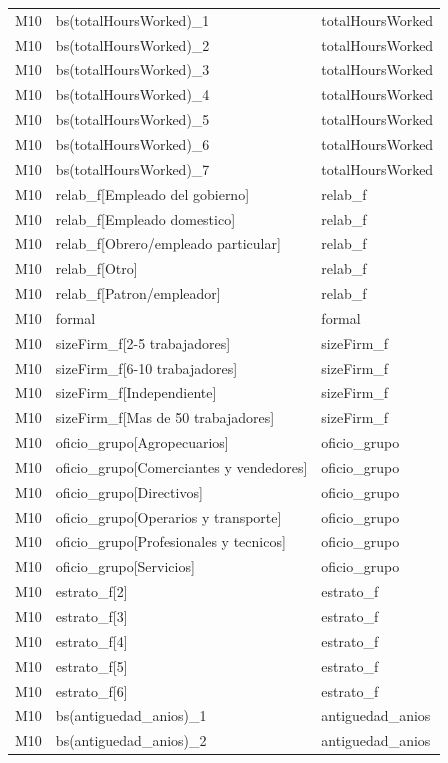 \begin{longtable}{lll}
M10 & bs(totalHoursWorked)\_1 & totalHoursWorked \\
M10 & bs(totalHoursWorked)\_2 & totalHoursWorked \\
M10 & bs(totalHoursWorked)\_3 & totalHoursWorked \\
M10 & bs(totalHoursWorked)\_4 & totalHoursWorked \\
M10 & bs(totalHoursWorked)\_5 & totalHoursWorked \\
M10 & bs(totalHoursWorked)\_6 & totalHoursWorked \\
M10 & bs(totalHoursWorked)\_7 & totalHoursWorked \\
M10 & relab\_f[Empleado del gobierno] & relab\_f \\
M10 & relab\_f[Empleado domestico] & relab\_f \\
M10 & relab\_f[Obrero/empleado particular] & relab\_f \\
M10 & relab\_f[Otro] & relab\_f \\
M10 & relab\_f[Patron/empleador] & relab\_f \\
M10 & formal & formal \\
M10 & sizeFirm\_f[2-5 trabajadores] & sizeFirm\_f \\
M10 & sizeFirm\_f[6-10 trabajadores] & sizeFirm\_f \\
M10 & sizeFirm\_f[Independiente] & sizeFirm\_f \\
M10 & sizeFirm\_f[Mas de 50 trabajadores] & sizeFirm\_f \\
M10 & oficio\_grupo[Agropecuarios] & oficio\_grupo \\
M10 & oficio\_grupo[Comerciantes y vendedores] & oficio\_grupo \\
M10 & oficio\_grupo[Directivos] & oficio\_grupo \\
M10 & oficio\_grupo[Operarios y transporte] & oficio\_grupo \\
M10 & oficio\_grupo[Profesionales y tecnicos] & oficio\_grupo \\
M10 & oficio\_grupo[Servicios] & oficio\_grupo \\
M10 & estrato\_f[2] & estrato\_f \\
M10 & estrato\_f[3] & estrato\_f \\
M10 & estrato\_f[4] & estrato\_f \\
M10 & estrato\_f[5] & estrato\_f \\
M10 & estrato\_f[6] & estrato\_f \\
M10 & bs(antiguedad\_anios)\_1 & antiguedad\_anios \\
M10 & bs(antiguedad\_anios)\_2 & antiguedad\_anios \\

\end{longtable}
